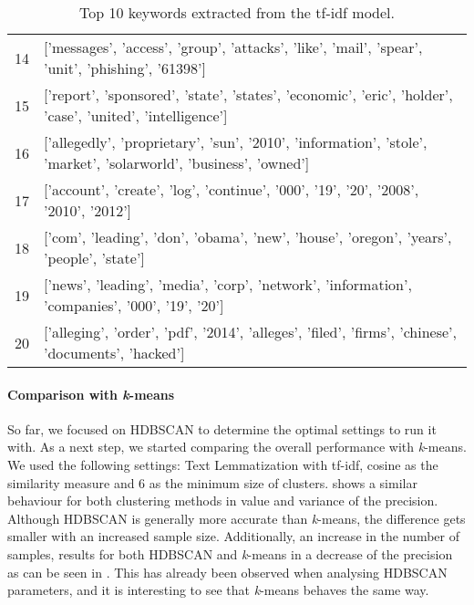 \begin{table}[h]
{\begin{tabular}{rl}
            14 & ['messages', 'access', 'group', 'attacks', 'like', 'mail', 'spear', 'unit', 'phishing', '61398']                        \\
            15 & ['report', 'sponsored', 'state', 'states', 'economic', 'eric', 'holder', 'case', 'united', 'intelligence']              \\
            16 & ['allegedly', 'proprietary', 'sun', '2010', 'information', 'stole', 'market', 'solarworld', 'business', 'owned']        \\
            17 & ['account', 'create', 'log', 'continue', '000', '19', '20', '2008', '2010', '2012']                                     \\
            18 & ['com', 'leading', 'don', 'obama', 'new', 'house', 'oregon', 'years', 'people', 'state']                                \\
            19 & ['news', 'leading', 'media', 'corp', 'network', 'information', 'companies', '000', '19', '20']                          \\
            20 & ['alleging', 'order', 'pdf', '2014', 'alleges', 'filed', 'firms', 'chinese', 'documents', 'hacked']                     \\
        \hline
        \end{tabular}
        }
        \caption{Top 10 keywords extracted from the tf-idf model.}
        \label{tab:clustering_example_features}
\end{table}

\paragraph{Comparison with \textit{k}-means}
So far, we focused on HDBSCAN to determine the optimal settings to run it with.
As a next step, we started comparing the overall performance with \textit{k}-means.
We used the following settings: Text Lemmatization with tf-idf,
cosine as the similarity measure and 6 as the minimum size of clusters.
 shows a similar behaviour
for both clustering methods in value and variance of the precision.
Although HDBSCAN is generally more accurate than \textit{k}-means,
the difference gets smaller with an increased sample size.
Additionally, an increase in the number of samples, results for both HDBSCAN
and \textit{k}-means in a decrease of the precision
as can be seen in .
This has already been observed when analysing HDBSCAN parameters, 
and it is interesting to see that \textit{k}-means behaves the same way.

